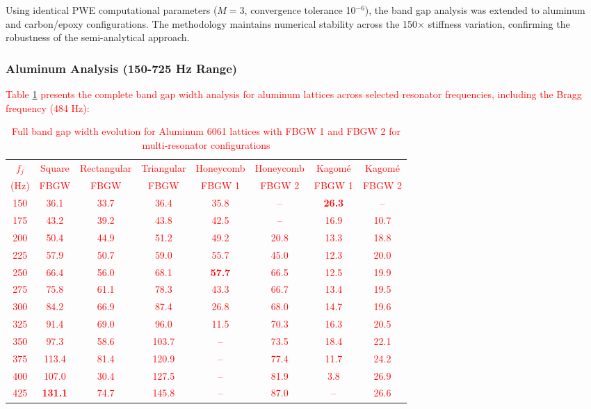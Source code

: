 \documentclass[review,numbers,sort&compress]{elsarticle}
\begin{document}
Using identical PWE computational parameters ($M = 3$, convergence tolerance 10$^{-6}$), the band gap analysis was extended to aluminum and carbon/epoxy configurations. The methodology maintains numerical stability across the 150× stiffness variation, confirming the robustness of the semi-analytical approach.

\subsubsection{Aluminum Analysis (150-725 Hz Range)}

\textcolor{red}{Table \ref{tab:aluminum_results} presents the complete band gap width analysis for aluminum lattices across selected resonator frequencies, including the Bragg frequency (484 Hz):}

\textcolor{red}{\begin{table}[!htb]
\centering
\caption{Full band gap width evolution for Aluminum 6061 lattices with FBGW 1 and FBGW 2 for multi-resonator configurations\protect\footnotemark[1]}
\label{tab:aluminum_results}
\small
\begin{tabular}{cccccccc}
\hline
$f_j$ & Square & Rectangular & Triangular & Honeycomb & Honeycomb & Kagom\'{e} & Kagom\'{e} \\
(Hz) & FBGW & FBGW & FBGW & FBGW 1 & FBGW 2 & FBGW 1 & FBGW 2 \\
\hline
150 & 36.1 & 33.7 & 36.4 & 35.8 & -- & \textbf{26.3} & -- \\
175 & 43.2 & 39.2 & 43.8 & 42.5 & -- & 16.9 & 10.7 \\
200 & 50.4 & 44.9 & 51.2 & 49.2 & 20.8 & 13.3 & 18.8 \\
225 & 57.9 & 50.7 & 59.0 & 55.7 & 45.0 & 12.3 & 20.0 \\
250 & 66.4 & 56.0 & 68.1 & \textbf{57.7} & 66.5 & 12.5 & 19.9 \\
275 & 75.8 & 61.1 & 78.3 & 43.3 & 66.7 & 13.4 & 19.5 \\
300 & 84.2 & 66.9 & 87.4 & 26.8 & 68.0 & 14.7 & 19.6 \\
325 & 91.4 & 69.0 & 96.0 & 11.5 & 70.3 & 16.3 & 20.5 \\
350 & 97.3 & 58.6 & 103.7 & -- & 73.5 & 18.4 & 22.1 \\
375 & 113.4 & 81.4 & 120.9 & -- & 77.4 & 11.7 & 24.2 \\
400 & 107.0 & 30.4 & 127.5 & -- & 81.9 & 3.8 & 26.9 \\
425 & \textbf{131.1} & 74.7 & 145.8 & -- & 87.0 & -- & 26.6 \\

\end{tabular}
\end{table}}
\end{document}
